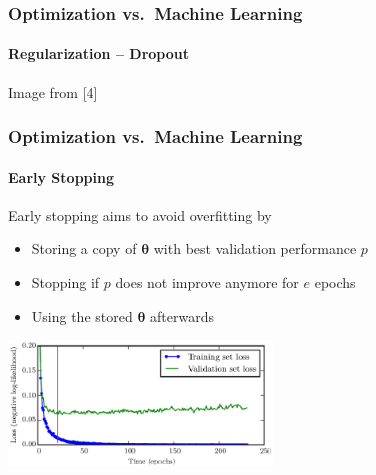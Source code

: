 \documentclass[xetex,professionalfont]{beamer}
\renewcommand\emph[1]{\textcolor{tuwcvl_cvl_blue}{#1}}
\newcommand{\bth}{\boldsymbol{\theta}}
\begin{document}
\begin{frame}
	\frametitle{Optimization vs.~Machine Learning}
	\framesubtitle{Regularization -- Dropout}

	\begin{center}
		{\centering Image from [4]}
	\end{center}

\end{frame}


\begin{frame}
	\frametitle{Optimization vs.~Machine Learning}
	\framesubtitle{Early Stopping}

	\emph{Early stopping} aims to avoid overfitting by
	\begin{itemize}
		\item Storing a copy of $\bth$ with best validation performance $p$
		\item Stopping if $p$ does not improve anymore for $e$ epochs
		\item Using the stored $\bth$ afterwards
	\end{itemize}

	\medskip

	\begin{center}
		\includegraphics[width=7cm]{images/early-stopping}
	\end{center}

\end{frame}
\end{document}
